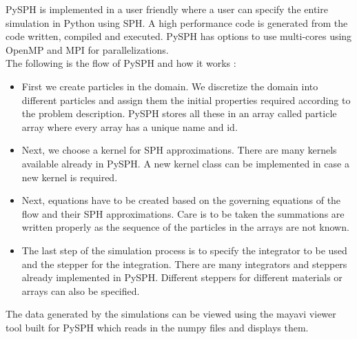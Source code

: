 PySPH is implemented in a user friendly where a user can specify the entire simulation in Python using SPH. A high performance code is generated from the code written, compiled and executed. PySPH has options to use multi-cores using OpenMP and MPI for parallelizations.\\



The following is the flow of PySPH and how it works \cite{janmejaya}:

\begin{itemize}
 \item First we create particles in the domain. We discretize the domain into different particles and assign them the initial properties required according to the problem description. PySPH stores all these in an array called particle array where every array has a unique name and id.
 \item Next, we choose a kernel for SPH approximations. There are many kernels available already in PySPH. A new kernel class can be implemented in case a new kernel is required.
 \item Next, equations have to be created based on the governing equations of the flow and their SPH approximations. Care is to be taken the summations are written properly as the sequence of the particles in the arrays are not known.
 \item The last step of the simulation process is to specify the integrator to be used and the stepper for the integration. There are many integrators and steppers already implemented in PySPH. Different steppers for different materials or arrays can also be specified.
\end{itemize}

The data generated by the simulations can be viewed using the mayavi viewer tool built for PySPH which reads in the numpy files and displays them.

